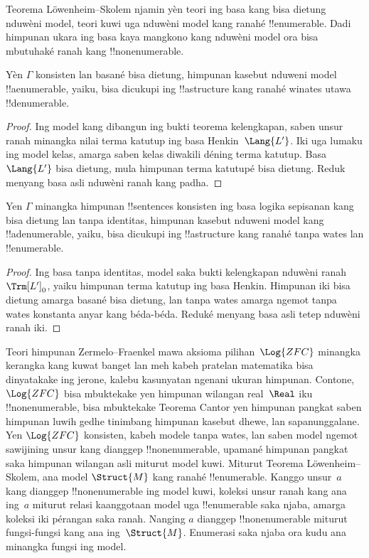 \documentclass[../../../include/open-logic-section]{subfiles}
\begin{document}

Teorema L\"owenheim--Skolem njamin yèn teori ing basa kang bisa
dietung nduwèni model, teori kuwi uga nduwèni model kang ranahé
!!{enumerable}. Dadi himpunan ukara ing basa kaya mangkono kang
nduwèni model ora bisa mbutuhaké ranah kang !!{nonenumerable}.

\begin{thm}
 Yèn $\Gamma$ konsisten lan basané bisa dietung, himpunan kasebut
nduweni model !!a{enumerable}, yaiku, bisa dicukupi ing
!!a{structure} kang ranahé winates utawa !!{denumerable}.
\end{thm}

\begin{proof}
Ing model kang dibangun ing bukti teorema kelengkapan,
saben unsur ranah minangka nilai terma katutup ing basa Henkin~$\Lang{L'}$.
Iki uga lumaku ing model kelas, amarga saben kelas diwakili déning
terma katutup. Basa~$\Lang{L'}$ bisa dietung, mula himpunan terma
katutupé bisa dietung. Reduk menyang basa asli nduwèni ranah kang padha.
\end{proof}

\begin{thm}
 Yen $\Gamma$ minangka himpunan
!!{sentence}s konsisten ing basa logika sepisanan kang bisa dietung lan tanpa identitas,
himpunan kasebut nduweni model kang !!a{denumerable}, yaiku, bisa dicukupi
ing !!a{structure} kang ranahé tanpa wates lan !!{enumerable}.
\end{thm}

\begin{proof}
Ing basa tanpa identitas, model saka bukti kelengkapan nduwèni
ranah ${\Trm[L']}_0$, yaiku himpunan terma katutup ing
basa Henkin. Himpunan iki bisa dietung amarga basané bisa dietung,
lan tanpa wates amarga ngemot tanpa wates konstanta anyar kang
béda-béda. Reduké menyang basa asli tetep nduwèni ranah iki.
\end{proof}

\begin{ex}
Teori himpunan Zermelo--Fraenkel mawa aksioma pilihan~$\Log{ZFC}$ minangka kerangka kang
kuwat banget lan meh kabeh pratelan matematika bisa dinyatakake ing
jerone, kalebu kasunyatan ngenani ukuran himpunan. Contone,
$\Log{ZFC}$ bisa mbuktekake yen himpunan wilangan real~$\Real$ iku
!!{nonenumerable}, bisa mbuktekake Teorema Cantor yen himpunan pangkat
saben himpunan luwih gedhe tinimbang himpunan kasebut dhewe, lan
sapanunggalane. Yen $\Log{ZFC}$ konsisten, kabeh modele tanpa wates,
lan saben model ngemot sawijining unsur kang dianggep
!!{nonenumerable}, upamané himpunan pangkat saka himpunan wilangan asli
miturut model kuwi. Miturut Teorema L\"owenheim--Skolem, ana model
$\Struct{M}$ kang ranahé !!{enumerable}. Kanggo unsur~$a$ kang
dianggep !!{nonenumerable} ing model kuwi, koleksi unsur ranah
kang ana ing~$a$ miturut relasi kaanggotaan model uga !!{enumerable}
saka njaba, amarga koleksi iki pérangan saka ranah. Nanging
$a$ dianggep !!{nonenumerable} miturut fungsi-fungsi kang ana ing~$\Struct{M}$. Enumerasi saka njaba ora kudu ana minangka fungsi ing model.
\end{ex}
\end{document}
